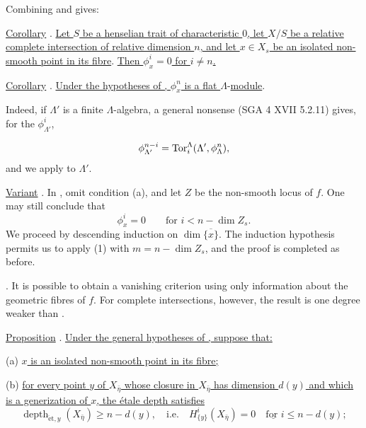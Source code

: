 Combining  and  gives:

\underline{Corollary} . \underline{Let $S$ be a henselian trait of
characteristic $0$, let $X/S$ be a relative complete intersection of
relative dimension $n$, and let $x\in X_s$ be an isolated non-smooth
point in its fibre}. \underline{Then $\phi^i_x=0$ for $i\ne n$.}

\underline{Corollary} . \underline{Under the hypotheses of ,
$\phi^n_x$ is a flat }$\Lambda$-\underline{module}.

Indeed, if $\Lambda'$ is a finite $\Lambda$-algebra, a general nonsense
(SGA 4 XVII 5.2.11) gives, for the $\phi^i_{\Lambda'}$,


\begin{equation*}
\phi^{n-i}_{\Lambda'}
=\operatorname{Tor}_i^\Lambda(\Lambda',\phi^n_\Lambda),
\end{equation*}
and we apply  to $\Lambda'$.

\underline{Variant} . In , omit condition (a), and let $Z$ be the
non-smooth locus of $f$. One may still conclude that
\begin{equation*}
\phi^i_x=0\qquad\text{for }i<n-\dim Z_s.
\end{equation*}
We proceed by descending induction on $\dim\overline{\{x\}}$. The
induction hypothesis permits us to apply  (1) with
$m=n-\dim Z_s$, and the proof is completed as before.

. It is possible to obtain a vanishing criterion using only
information about the geometric fibres of $f$. For complete
intersections, however, the result is one degree weaker than .

\underline{Proposition} . \underline{Under the general hypotheses
of , suppose that:}

(a) \underline{$x$ is an isolated non-smooth point in its fibre;}

(b) \underline{for every point $y$ of $X_{\bar\eta}$ whose closure in
$X_{\bar\eta}$ has dimension $d(y)$ and which is a generization of $x$,
the \'{e}tale depth satisfies}
\begin{equation*}
\operatorname{depth}_{\mathrm{\acute{e}t},y}(X_{\bar\eta})
\geqslant n-d(y),
\quad\text{i.e.}\quad
H^i_{\{y\}}(X_{\bar\eta})=0
\quad\underline{\text{for }}i\leqslant n-d(y);
\end{equation*}

